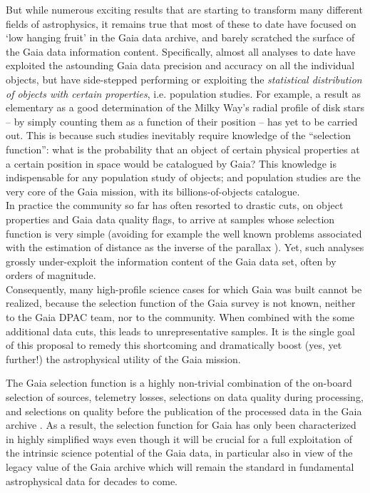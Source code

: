 But while numerous exciting results that are starting to transform many different fields of astrophysics,
it remains true that most of these to date have focused on `low hanging fruit' in the Gaia data archive, and barely scratched the surface of the Gaia data information content. 
Specifically, almost all analyses to date have exploited the astounding Gaia data precision and accuracy
on all the individual objects, but have side-stepped performing or exploiting the \textsl{statistical distribution of objects with certain properties}, i.e. population studies. For example, a result as elementary as a good determination of the Milky Way's radial profile of disk stars -- by simply counting them as a function of their position -- has yet to be carried out.  This is because such studies inevitably require knowledge of the ``selection function'': what is the probability that an object of certain physical properties at a certain position in space would be catalogued by Gaia? This knowledge is indispensable for any population study of objects; and population studies are the very core of the Gaia mission, with its billions-of-objects catalogue. \\
In practice the community so far has often resorted to drastic cuts, on object properties and Gaia data quality flags, to arrive at samples whose selection function is very simple (avoiding for example the well known problems associated with the estimation of distance as the inverse of the parallax \cite{2018A&A...616A...9L}). Yet, such analyses grossly under-exploit the information content of the Gaia data set, often by orders of magnitude. \\
Consequently, many high-profile science cases for which Gaia was
built cannot be realized, because the selection function of the Gaia survey is not known, neither to the Gaia DPAC team, nor to the community. When  combined with the some additional data cuts, this leads to
unrepresentative samples. It is the single goal of this proposal to remedy this shortcoming and dramatically boost (yes, yet further!) the astrophysical utility of the Gaia mission.

The Gaia selection function is a highly non-trivial combination of the on-board selection of sources, telemetry
losses, selections on data quality during 
processing, and selections on quality before the publication of the
processed data in the Gaia archive . As a result, the
selection function for Gaia has only been characterized in highly simplified ways  even though it will be crucial for a full exploitation of the intrinsic science
potential of the Gaia data, in particular also in view of the legacy value of the Gaia archive which will remain
the standard in fundamental astrophysical data for decades to come.

